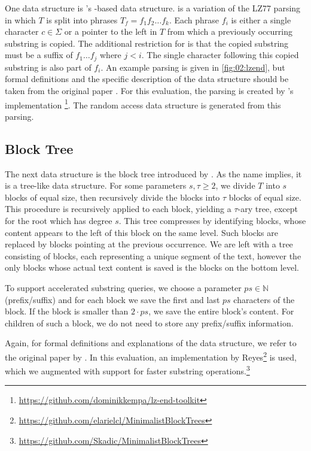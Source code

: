 \documentclass{scrartcl}
\begin{document}
One data structure is \citeauthor{kreft_self-index_2011}'s \lzend{}-based data structure.
\lzend{} is a variation of the LZ77 parsing \cite{ziv_universal_1977} in which $T$ is split into phrases $T_f = f_1 f_2 \dots f_k$.
Each phrase $f_i$ is either a single character $c \in \Sigma$ or a pointer to the left in $T$ from which a previously occurring substring is copied. The additional restriction for \lzend{} is that the copied substring must be a suffix of $f_1 \dots f_j$ where $j < i$.
The single character following this copied substring is also part of $f_i$.
An example parsing is given in \cref{fig:02:lzend}, but formal definitions and the specific description of the data structure should be taken from the original paper \cite{kreft_self-index_2011}.
For this evaluation, the parsing is created by \citeauthor{kempa_lz-end_2017}'s implementation \cite{kempa_lz-end_2017}\footnote{\url{https://github.com/dominikkempa/lz-end-toolkit}}.
The random access data structure is generated from this parsing.

\subsection{Block Tree}

The next data structure is the block tree introduced by \citeauthor{belazzougui_block_2021} \cite{belazzougui_block_2021}.
As the name implies, it is a tree-like data structure.
For some parameters $s, \tau \geq 2$, we divide $T$ into $s$ blocks of equal size, then recursively divide the blocks into $\tau$ blocks of equal size.
This procedure is recursively applied to each block, yielding a $\tau$-ary tree, except for the root which has degree $s$.
This tree compresses by identifying blocks, whose content appears to the left of this block on the same level.
Such blocks are replaced by blocks pointing at the previous occurrence.
We are left with a tree consisting of blocks, each representing a unique segment of the text, however the only blocks whose actual text content is saved is the blocks on the bottom level.

To support accelerated substring queries, we choose a parameter $ps \in \mathbb{N}$ (prefix/suffix) and for each block we save the first and last $ps$ characters of the block.
If the block is smaller than $2 \cdot ps$, we save the entire block's content.
For children of such a block, we do not need to store any prefix/suffix information.

Again, for formal definitions and explanations of the data structure, we refer to the original paper by \citeauthor{belazzougui_block_2021} \cite{belazzougui_block_2021}.
In this evaluation, an implementation by Reyes\footnote{\url{https://github.com/elarielcl/MinimalistBlockTrees}} is used, which we augmented with support for faster substring operations.\footnote{\url{https://github.com/Skadic/MinimalistBlockTrees}}
\end{document}

